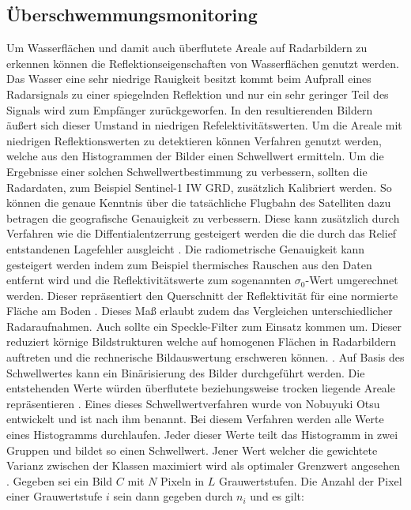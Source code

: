 \subsection{Überschwemmungsmonitoring}
Um Wasserflächen und damit auch überflutete Areale auf Radarbildern zu erkennen können die Reflektionseigenschaften von Wasserflächen genutzt werden. Das Wasser eine 
sehr niedrige Rauigkeit besitzt kommt beim Aufprall eines Radarsignals zu einer spiegelnden Reflektion und nur ein sehr geringer Teil des Signals wird zum Empfänger 
zurückgeworfen. In den resultierenden Bildern äußert sich dieser Umstand in niedrigen Refelektivitätswerten. 
Um die Areale mit niedrigen Reflektionswerten zu detektieren können Verfahren genutzt werden, welche aus den Histogrammen der Bilder einen Schwellwert ermitteln.
Um die Ergebnisse einer solchen Schwellwertbestimmung zu verbessern, sollten die Radardaten, zum Beispiel Sentinel-1 IW GRD, zusätzlich Kalibriert werden. 
So können die genaue Kenntnis über die tatsächliche Flugbahn des Satelliten dazu betragen die geografische Genauigkeit zu verbessern. Diese kann zusätzlich durch Verfahren 
wie die Diffentialentzerrung gesteigert werden die die durch das Relief entstandenen Lagefehler ausgleicht \cite{einfuehrung_in_fernerkundung}.
Die radiometrische Genauigkeit kann gesteigert werden indem zum Beispiel thermisches Rauschen aus den Daten entfernt wird und die Reflektivitätswerte zum 
sogenannten $\sigma_0$-Wert umgerechnet werden. Dieser repräsentiert den Querschnitt der Reflektivität für eine normierte Fläche am Boden \cite{radiometric_calibration_of_S1_level1_products}.
Dieses Maß erlaubt zudem das Vergleichen unterschiedlicher Radaraufnahmen.  
Auch sollte ein Speckle-Filter zum Einsatz kommen um. Dieser reduziert körnige Bildstrukturen welche auf homogenen Flächen in Radarbildern auftreten und die 
rechnerische Bildauswertung erschweren können. \cite{einfuehrung_in_fernerkundung}\cite{sentinel_1_flood_mapping_tutorial}.  
Auf Basis des Schwellwertes kann ein Binärisierung des Bilder durchgeführt werden. Die entstehenden Werte würden überflutete beziehungsweise trocken liegende 
Areale repräsentieren \cite{sentinel_1_flood_mapping_tutorial}.
Eines dieses Schwellwertverfahren wurde von Nobuyuki Otsu entwickelt und ist nach ihm benannt. Bei diesem Verfahren werden alle Werte eines Histogramms durchlaufen.
Jeder dieser Werte teilt das Histogramm in zwei Gruppen und bildet so einen Schwellwert. Jener Wert welcher die gewichtete Varianz zwischen der Klassen maximiert wird
als optimaler Grenzwert angesehen \cite{thresholds_selection}.
Gegeben sei ein Bild $C$ mit $N$ Pixeln in $L$ Grauwertstufen. Die Anzahl der Pixel einer Grauwertstufe $i$ sein dann gegeben durch $n_i$ und es gilt:


